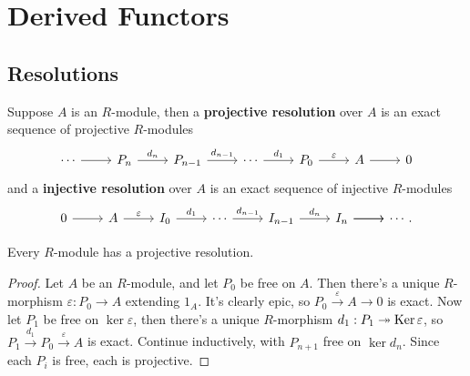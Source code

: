 \documentclass[twoside,10pt]{report}
\begin{document}

\chapter{Derived Functors}

\section{Resolutions}

\begin{defn}[]
Suppose $A$ is an $R$-module, then a \textbf{projective resolution} over $A$ is an exact sequence of projective $R$-modules
\[
\begin{tikzcd}
	\cdots \rar & P_{n}\rar{d_{n}} & P_{n-1}\rar{d_{n-1}} & \cdots \rar{d_1} & P_0 \rar{\varepsilon} & A \rar & 0
\end{tikzcd}
\] 
and a \textbf{injective resolution} over $A$ is an exact sequence of injective $R$-modules
\[
\begin{tikzcd}
	0 \rar & A \rar{\varepsilon} & I_{0} \rar{d_{1}} & \cdots \rar{d_{n-1}} & I_{n-1}\rar{d_{n}} & I_{n} \rar \rar & \cdots.
\end{tikzcd}
\] 
\end{defn}

\begin{thrm}[Existence]
	Every $R$-module has a projective  resolution.
\end{thrm}
\begin{proof}
	Let $A$ be an $R$-module, and let $P_0$ be free on $A$. Then there's a unique $R$-morphism $\varepsilon:P_0\to A$ extending $1_{A}$. It's clearly epic, so $P_0 \stackrel{\varepsilon}{\to } A\to 0$ is exact. Now let $P_1$ be free on $\ker \varepsilon$, then there's a unique $R$-morphism $d_1:P_1\twoheadrightarrow \operatorname{Ker} \varepsilon$, so $P_1\stackrel{d_1}{\to } P_0\stackrel{\varepsilon}{\to } A$ is exact. Continue inductively, with $P_{n+1}$ free on $\ker d_{n}$. Since each $P_i$ is free, each is projective.
\end{proof}
\end{document}
